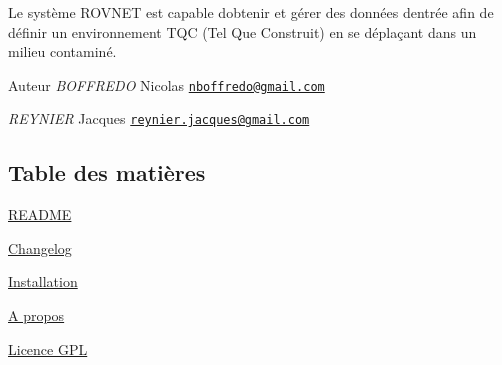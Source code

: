 Le système R\+OV\textquotesingle{}N\+ET est capable d\textquotesingle{}obtenir et gérer des données d\textquotesingle{}entrée afin de définir un environnement T\+QC (Tel Que Construit) en se déplaçant dans un milieu contaminé.

\begin{DoxyAuthor}{Auteur}
{\itshape B\+O\+F\+F\+R\+E\+DO} Nicolas \href{mailto:nboffredo@gmail.com}{\tt nboffredo@gmail.\+com}

{\itshape R\+E\+Y\+N\+I\+ER} Jacques \href{mailto:reynier.jacques@gmail.com}{\tt reynier.\+jacques@gmail.\+com}
\end{DoxyAuthor}
\hypertarget{index_section_tdm}{}\subsection{Table des matières}\label{index_section_tdm}

\begin{DoxyItemize}
\item \hyperlink{page__r_e_a_d_m_e}{R\+E\+A\+D\+ME}
\item \hyperlink{page_changelog}{Changelog}
\item \hyperlink{page_install}{Installation}
\item \hyperlink{page_about}{A propos}
\item \hyperlink{page_licence}{Licence G\+PL} 
\end{DoxyItemize}